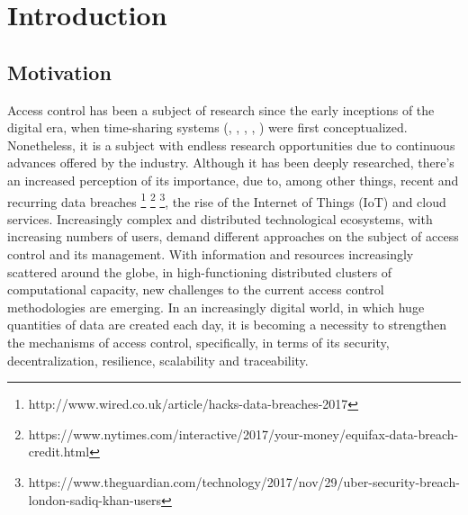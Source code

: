 \chapter{Introduction}
\label{chap:intro}

\section{Motivation}

Access control has been a subject of research since the early inceptions of the digital era, when time-sharing systems (\cite{weissman_security_1969}, \cite{graham_protection_1971}, \cite{bell_secure_1973}, \cite{lampson_protection_1974}, \cite{denning_lattice_1976}) were first conceptualized. Nonetheless, it is a subject with endless research opportunities due to continuous advances offered by the industry. Although it has been deeply researched, there's an increased perception of its importance, due to, among other things, recent and recurring data breaches \footnote{http://www.wired.co.uk/article/hacks-data-breaches-2017} \footnote{https://www.nytimes.com/interactive/2017/your-money/equifax-data-breach-credit.html} \footnote{https://www.theguardian.com/technology/2017/nov/29/uber-security-breach-london-sadiq-khan-users}, the rise of the Internet of Things (IoT) and cloud services. Increasingly complex and distributed technological ecosystems, with increasing numbers of users, demand different approaches on the subject of access control and its management. With information and resources increasingly scattered around the globe, in high-functioning distributed clusters of computational capacity, new challenges to the current access control methodologies are emerging. In an increasingly digital world, in which huge quantities of data are created each day, it is becoming a necessity to strengthen the mechanisms of access control, specifically, in terms of its security, decentralization, resilience, scalability and traceability.

